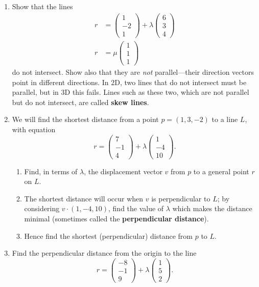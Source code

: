 \documentclass{article}
\begin{document}
\begin{enumerate}
	\item Show that the lines
		\begin{align*}
			r&=\left(\begin{array}{c}1\\-2\\1\end{array}\right)+\lambda \left(\begin{array}{c}6\\3\\4\end{array}\right)\\
			r&= \mu\left(\begin{array}{c}1\\1\\1\end{array}\right)
		\end{align*}
		do not intersect. Show also that they are \textit{not} parallel---their direction vectors point in different directions. In 2D, two lines that do not intersect must be parallel, but in 3D this fails. Lines such as these two, which are not parallel but do not intersect, are called \textbf{skew lines}.
	\item We will find the shortest distance from a point $p=(1,3,-2)$ to a line $L$, with equation
		\[r=\left(\begin{array}{c}7\\-1\\4\end{array}\right)+\lambda \left(\begin{array}{c}1\\-4\\10\end{array}\right).\]
		\begin{enumerate}
			\item Find, in terms of $\lambda$, the displacement vector $v$ from $p$ to a general point $r$ on $L$.
			\item The shortest distance will occur when $v$ is perpendicular to $L$; by considering $v\cdot(1,-4,10)$, find the value of $\lambda$ which makes the distance minimal (sometimes called the \textbf{perpendicular distance}).
			\item Hence find the shortest (perpendicular) distance from $p$ to $L$.
		\end{enumerate}
	\item Find the perpendicular distance from the origin to the line
		\[r=\left(\begin{array}{c}-8\\-1\\9\end{array}\right)+\lambda \left(\begin{array}{c}1\\5\\2\end{array}\right).\]

\end{enumerate}
\end{document}
